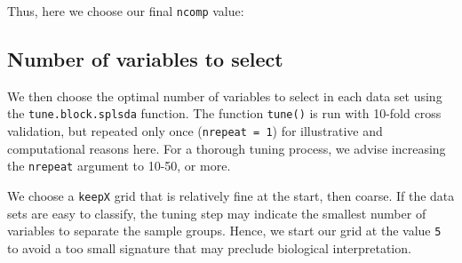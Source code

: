 \documentclass[
]{book}
\newenvironment{Shaded}{\begin{snugshade}}{\end{snugshade}}
\newcommand{\NormalTok}[1]{#1}
\newcommand{\OtherTok}[1]{\textcolor[rgb]{0.56,0.35,0.01}{#1}}
\newcommand{\SpecialCharTok}[1]{\textcolor[rgb]{0.00,0.00,0.00}{#1}}
\newcommand{\StringTok}[1]{\textcolor[rgb]{0.31,0.60,0.02}{#1}}
\begin{document}
\begin{Shaded}
\end{Shaded}

Thus, here we choose our final \texttt{ncomp} value:

\begin{Shaded}
\end{Shaded}

\hypertarget{diablo:numvar}{%
\subsection{Number of variables to select}\label{diablo:numvar}}

We then choose the optimal number of variables to select in each data set using the \texttt{tune.block.splsda} function. The function \texttt{tune()} is run with 10-fold cross validation, but repeated only once (\texttt{nrepeat\ =\ 1}) for illustrative and computational reasons here. For a thorough tuning process, we advise increasing the \texttt{nrepeat} argument to 10-50, or more.

We choose a \texttt{keepX} grid that is relatively fine at the start, then coarse. If the data sets are easy to classify, the tuning step may indicate the smallest number of variables to separate the sample groups. Hence, we start our grid at the value \texttt{5} to avoid a too small signature that may preclude biological interpretation.
\end{document}
